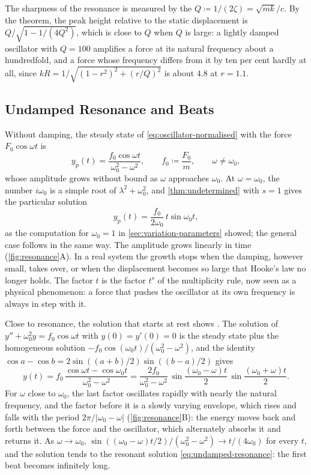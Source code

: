 The sharpness of the resonance is measured by the  $Q\coloneqq1/(2\zeta)=\sqrt{mk}/c$. By the theorem, the peak height relative to the static displacement is $Q/\sqrt{1-1/(4Q^2)}$, which is close to $Q$ when $Q$ is large: a lightly damped oscillator with $Q=100$ amplifies a force at its natural frequency about a hundredfold, and a force whose frequency differs from it by ten per cent hardly at all, since $kR=1/\sqrt{(1-r^2)^2+(r/Q)^2}$ is about $4.8$ at $r=1.1$.

\subsection{Undamped Resonance and Beats}

Without damping, the steady state of \eqref{eq:oscillator-normalised} with the force $F_0\cos\omega t$ is
\[
y_{\mathrm p}(t)=\frac{f_0\cos\omega t}{\omega_0^2-\omega^2},\qquad f_0\coloneqq\frac{F_0}m,\qquad\omega\ne\omega_0,
\]
whose amplitude grows without bound as $\omega$ approaches $\omega_0$. At $\omega=\omega_0$, the number $i\omega_0$ is a simple root of $\lambda^2+\omega_0^2$, and \cref{thm:undetermined} with $s=1$ gives the particular solution
\begin{equation}
y_{\mathrm p}(t)=\frac{f_0}{2\omega_0}\,t\sin\omega_0t ,
\label{eq:undamped-resonance}
\end{equation}
as the computation for $\omega_0=1$ in \cref{sec:variation-parameters} showed; the general case follows in the same way. The amplitude grows linearly in time (\cref{fig:resonance}A). In a real system the growth stops when the damping, however small, takes over, or when the displacement becomes so large that Hooke's law no longer holds. The factor $t$ is the factor $t^s$ of the multiplicity rule, now seen as a physical phenomenon: a force that pushes the oscillator at its own frequency is always in step with it.

Close to resonance, the solution that starts at rest shows . The solution of $y''+\omega_0^2y=f_0\cos\omega t$ with $y(0)=y'(0)=0$ is the steady state plus the homogeneous solution $-f_0\cos(\omega_0t)/(\omega_0^2-\omega^2)$, and the identity $\cos a-\cos b=2\sin((a+b)/2)\sin((b-a)/2)$ gives
\[
y(t)=f_0\,\frac{\cos\omega t-\cos\omega_0t}{\omega_0^2-\omega^2}=\frac{2f_0}{\omega_0^2-\omega^2}\,\sin\frac{(\omega_0-\omega)t}2\,\sin\frac{(\omega_0+\omega)t}2 .
\]
For $\omega$ close to $\omega_0$, the last factor oscillates rapidly with nearly the natural frequency, and the factor before it is a slowly varying envelope, which rises and falls with the period $2\pi/|\omega_0-\omega|$ (\cref{fig:resonance}B): the energy moves back and forth between the force and the oscillator, which alternately absorbs it and returns it. As $\omega\to\omega_0$, $\sin((\omega_0-\omega)t/2)/(\omega_0^2-\omega^2)\to t/(4\omega_0)$ for every $t$, and the solution tends to the resonant solution \eqref{eq:undamped-resonance}: the first beat becomes infinitely long.


